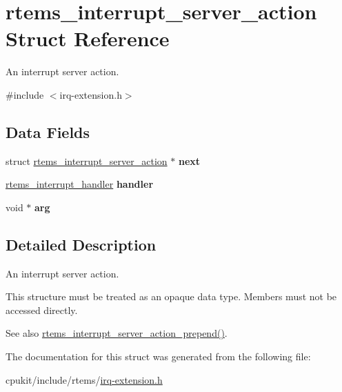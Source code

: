 \hypertarget{structrtems__interrupt__server__action}{}\section{rtems\+\_\+interrupt\+\_\+server\+\_\+action Struct Reference}
\label{structrtems__interrupt__server__action}


An interrupt server action.  




{\ttfamily \#include $<$irq-\/extension.\+h$>$}

\subsection*{Data Fields}
\begin{DoxyCompactItemize}
\item 
\mbox{\label{structrtems__interrupt__server__action_a32ab2825f668bedd88c1408491c6f9a7}} 
struct \mbox{\hyperlink{structrtems__interrupt__server__action}{rtems\+\_\+interrupt\+\_\+server\+\_\+action}} $\ast$ {\bfseries next}
\item 
\mbox{\label{structrtems__interrupt__server__action_aae0849127c05afb1c0434439cc7c25fc}} 
\mbox{\hyperlink{group__rtems__interrupt__extension_gab39bd096ab2c3b41d03dace0e9777b08}{rtems\+\_\+interrupt\+\_\+handler}} {\bfseries handler}
\item 
\mbox{\label{structrtems__interrupt__server__action_a05b50e2b5451a4170fa766a233447ba7}} 
void $\ast$ {\bfseries arg}
\end{DoxyCompactItemize}


\subsection{Detailed Description}
An interrupt server action. 

This structure must be treated as an opaque data type. Members must not be accessed directly.

\begin{DoxySeeAlso}{See also}
\mbox{\hyperlink{group__rtems__interrupt__extension_ga734c36a08deae3d40775f46e526526be}{rtems\+\_\+interrupt\+\_\+server\+\_\+action\+\_\+prepend()}}. 
\end{DoxySeeAlso}


The documentation for this struct was generated from the following file\+:\begin{DoxyCompactItemize}
\item 
cpukit/include/rtems/\mbox{\hyperlink{irq-extension_8h}{irq-\/extension.\+h}}\end{DoxyCompactItemize}
